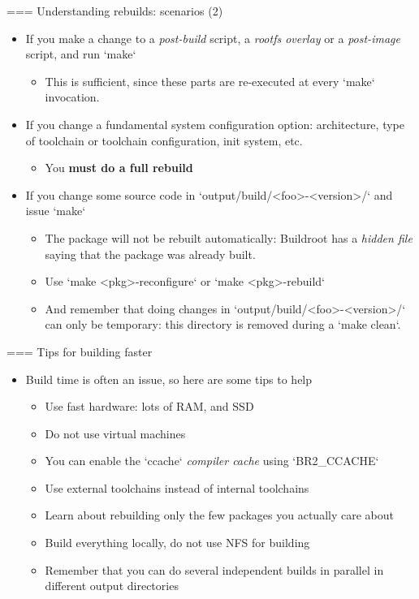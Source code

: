 === {Understanding rebuilds: scenarios (2)}
  \begin{itemize}
  \item If you make a change to a {\em post-build} script, a {\em
      rootfs overlay} or a {\em post-image} script, and run
    `make`
    \begin{itemize}
    \item This is sufficient, since these parts are re-executed at
      every `make` invocation.
    \end{itemize}
  \item If you change a fundamental system configuration option:
    architecture, type of toolchain or toolchain configuration, init
    system, etc.
    \begin{itemize}
    \item You {\bf must do a full rebuild}
    \end{itemize}
  \item If you change some source code in
    `output/build/<foo>-<version>/` and issue `make`
    \begin{itemize}
    \item The package will not be rebuilt automatically: Buildroot has
      a {\em hidden file} saying that the package was already built.
    \item Use `make <pkg>-reconfigure` or `make <pkg>-rebuild`
    \item And remember that doing changes in
      `output/build/<foo>-<version>/` can only be temporary: this
      directory is removed during a `make clean`.
    \end{itemize}
  \end{itemize}


=== {Tips for building faster}
  \begin{itemize}
  \item Build time is often an issue, so here are some tips to help
    \begin{itemize}
    \item Use fast hardware: lots of RAM, and SSD
    \item Do not use virtual machines
    \item You can enable the `ccache` {\em compiler cache} using
      `BR2_CCACHE`
    \item Use external toolchains instead of internal toolchains
    \item Learn about rebuilding only the few packages you actually
      care about
    \item Build everything locally, do not use NFS for building
    \item Remember that you can do several independent builds in
      parallel in different output directories
    \end{itemize}
  \end{itemize}


